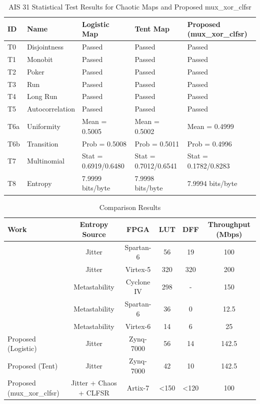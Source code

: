 \begin{table}[t]
\centering
\caption{AIS 31 Statistical Test Results for Chaotic Maps and Proposed mux\_xor\_clfsr}
\label{tab:ais31_results}
\begin{tabular}{lllll}
\hline\hline
\textbf{ID} & \textbf{Name} & \textbf{Logistic Map} & \textbf{Tent Map} & \textbf{Proposed (mux\_xor\_clfsr)} \\
\hline
T0 & Disjointness & Passed & Passed & Passed \\
T1 & Monobit & Passed & Passed & Passed \\
T2 & Poker & Passed & Passed & Passed \\
T3 & Run & Passed & Passed & Passed \\
T4 & Long Run & Passed & Passed & Passed \\
T5 & Autocorrelation & Passed & Passed & Passed \\
\hline
T6a & Uniformity & Mean = 0.5005 & Mean = 0.5002 & Mean = 0.4999 \\
T6b & Transition & Prob = 0.5008 & Prob = 0.5011 & Prob = 0.4996 \\
T7 & Multinomial & Stat = 0.6919/0.6480 & Stat = 0.7012/0.6541 & Stat = 0.1782/0.8283 \\
T8 & Entropy & 7.9999 bits/byte & 7.9998 bits/byte & 7.9994 bits/byte \\
\hline\hline
\end{tabular}
\end{table}

\begin{table}[t]
\centering
\caption{Comparison Results}
\label{tab:comparison}
\begin{tabular}{lccccc}
\hline\hline
\textbf{Work} & \textbf{Entropy Source} & \textbf{FPGA} & \textbf{LUT} & \textbf{DFF} & \textbf{Throughput (Mbps)} \\
\hline
[3] & Jitter & Spartan-6 & 56 & 19 & 100 \\
[12] & Jitter & Virtex-5 & 320 & 320 & 200 \\
[13] & Metastability & Cyclone IV & 298 & - & 150 \\
[14] & Metastability & Spartan-6 & 36 & 0 & 12.5 \\
[15] & Metastability & Virtex-6 & 14 & 6 & 25 \\
Proposed (Logistic) & Jitter & Zynq-7000 & 56 & 14 & 142.5 \\
Proposed (Tent) & Jitter & Zynq-7000 & 42 & 10 & 142.5 \\
Proposed (mux_xor_clfsr) & Jitter + Chaos + CLFSR & Artix-7 & <150 & <120 & 100 \\
\hline\hline
\end{tabular}
\end{table}
